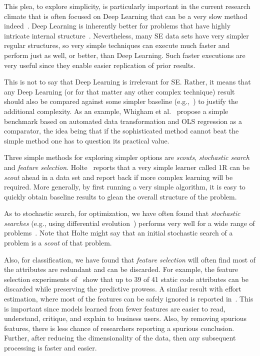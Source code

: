 \documentclass[preprint,10pt]{elsarticle}
\begin{document}
This plea, to explore simplicity, is particularly important in the current research climate that is often focused on  Deep Learning that can be a very slow method indeed~\cite{fu2017easy}. Deep Learning is inherently better for problems that have highly intricate internal structure~\cite{lecun2015deep}. Nevertheless, many SE data sets have very simpler regular structures, so very simple techniques can execute much faster and perform just as well, or better, than Deep Learning. Such faster executions are very useful since they enable easier replication of prior results.

This is not to say that Deep Learning is irrelevant for SE. Rather, it means that any Deep Learning (or for that matter any other complex technique) result should also be compared against some simpler baseline (e.g.,~\cite{fu2017}) to justify the additional complexity.  As an example, Whigham et al.~\cite{Whig15} propose a simple benchmark based on automated data transformation and OLS regression as a comparator, the idea being that if the sophisticated method cannot beat the simple method one has to question its practical value.

Three simple methods for exploring simpler options are {\em scouts}, {\em stochastic search} and {\em feature selection}. Holte~\cite{Holte1993} reports that a very simple learner called 1R can be {\em scout} ahead in a data set and report back if more complex learning will be required. More generally, by first running a very simple algorithm, it is easy to quickly obtain baseline results to glean the overall structure of the problem.

As to stochastic search, for optimization, we have often found that {\em stochastic searches} (e.g., using differential evolution~\cite{Storn1997}) performs very well for a wide range of problems~\cite{fu2016, agrawal16, agrawal18}.  Note that Holte might say that an initial stochastic search of a problem is a {\em scout} of that problem.

Also, for classification, we have found that {\em feature selection} will often find most of the attributes are redundant and can be discarded.  For example, the feature selection experiments of~\cite{menzies07} show that up to 39 of 41 static code attributes can be discarded while preserving the predictive prowess. A similar result with effort estimation, where most of the features can be safely ignored is reported in~\cite{chen2005}. This is important since models learned from fewer features are easier to read, understand, critique, and explain to business users. Also, by removing spurious features, there is less chance of researchers reporting a spurious conclusion. Further, after reducing the dimensionality of the data, then any subsequent processing is faster and easier.
\end{document}
